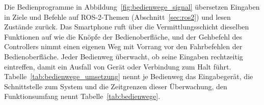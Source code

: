 Die Bedienprogramme in Abbildung~\ref{fig:bedienwege_signal} übersetzen Eingaben in Ziele und Befehle auf ROS-2-Themen (Abschnitt~\ref{sec:ros2}) und lesen Zustände zurück.
Das Smartphone ruft über die Vermittlungsschicht dieselben Funktionen auf wie die Knöpfe der Bedienoberfläche, und der Gehbefehl des Controllers nimmt einen eigenen Weg mit Vorrang vor den Fahrbefehlen der Bedienoberfläche.
Jeder Bedienweg überwacht, ob seine Eingaben rechtzeitig eintreffen, damit ein Ausfall von Gerät oder Verbindung zum Halt führt.
Tabelle~\ref{tab:bedienwege_umsetzung} nennt je Bedienweg das Eingabegerät, die Schnittstelle zum System und die Zeitgrenzen dieser Überwachung, den Funktionsumfang nennt Tabelle~\ref{tab:bedienwege}.

